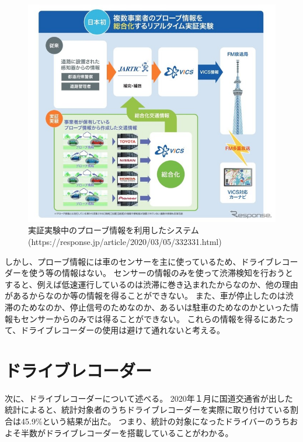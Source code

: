 \begin{figure}[htbp]
  \begin{center}
   \includegraphics{figs/probe.jpg}
  \end{center}
  \caption{実証実験中のプローブ情報を利用したシステム(https://response.jp/article/2020/03/05/332331.html)}
  \label{fig:probe}
\end{figure}
\newpage
しかし、プローブ情報には車のセンサーを主に使っているため、ドライブレコーダーを使う等の情報はない。
センサーの情報のみを使って渋滞検知を行おうとすると、例えば低速運行しているのは渋滞に巻き込まれたからなのか、他の理由があるからなのか等の情報を得ることができない。
また、車が停止したのは渋滞のためなのか、停止信号のためなのか、あるいは駐車のためなのかといった情報もセンサーからのみでは得ることができない。
これらの情報を得るにあたって、ドライブレコーダーの使用は避けて通れないと考える。


\section{ドライブレコーダー}
次に、ドライブレコーダーについて述べる。
2020年１月に国道交通省が出した統計によると、統計対象者のうちドライブレコーダーを実際に取り付けている割合は45.9\%という結果が出た。
つまり、統計の対象になったドライバーのうちおよそ半数がドライブレコーダーを搭載していることがわかる。
